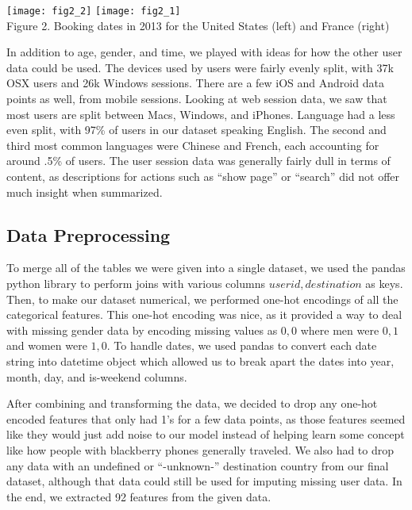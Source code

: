 \documentclass[a4paper, 11pt]{article}
\begin{document}
\begin{center}
\texttt{[image: fig2\_2]}
\texttt{[image: fig2\_1]} \\
Figure 2. Booking dates in 2013 for the United States (left) and France (right)
\end{center}

\par
In addition to age, gender, and time, we played with ideas for how the other user data could be used. The devices used by users were fairly evenly split, with 37k OSX users and 26k Windows sessions. There are a few iOS and Android data points as well, from mobile sessions. Looking at web session data, we saw that most users are split between Macs, Windows, and iPhones. Language had a less even split, with 97\% of users in our dataset speaking English. The second and third most common languages were Chinese and French, each accounting for around .5\% of users. The user session data was generally fairly dull in terms of content, as descriptions for actions such as “show page” or “search” did not offer much insight when summarized.

\subsection*{Data Preprocessing}
\par
To merge all of the tables we were given into a single dataset, we used the pandas python library to perform joins with various columns \(user id, destination\) as keys. Then, to make our dataset numerical, we performed one-hot encodings of all the categorical features. This one-hot encoding was nice, as it provided a way to deal with missing gender data by encoding missing values as \(0, 0\) where men were \(0, 1\) and women were \(1, 0\). To handle dates, we used pandas to convert each date string into datetime object which allowed us to break apart the dates into year, month, day, and is-weekend columns. 
\par
After combining and transforming the data, we decided to drop any one-hot encoded features that only had 1’s for a few data points, as those features seemed like they would just add noise to our model instead of helping learn some concept like how people with blackberry phones generally traveled. We also had to drop any data with an undefined or “-unknown-” destination country from our final dataset, although that data could still be used for imputing missing user data. In the end, we extracted 92 features from the given data.
\end{document}
